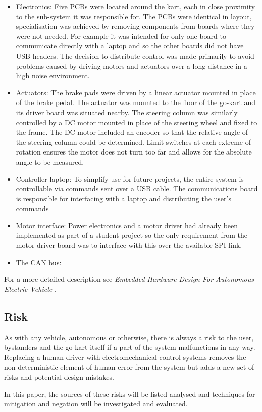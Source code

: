 \begin{itemize}
 \item Electronics: Five PCBs were located around the kart, each in close proximity to 
 the sub-system it was responsible for. The PCBs were identical in layout, specialisation was
 achieved by removing components from boards where they were not needed. For example
 it was intended for only one board to communicate directly with a laptop and so the other
 boards did not have USB headers. The decision to distribute control was made primarily to avoid
 problems caused by driving motors and actuators over a long distance in a high noise environment.
 \item Actuators: The brake pads were driven by a linear actuator mounted in place of the brake pedal. 
 The actuator was mounted to the floor of the go-kart and its driver board was situated nearby. The 
 steering column was similarly controlled by a DC motor mounted in place of the steering wheel 
 and fixed to the frame. The DC motor included an encoder so that the relative angle of the 
 steering column could be determined. Limit switches at each extreme of rotation ensures the
 motor does not turn too far and allows for the absolute angle to be measured.
 \item Controller laptop: To simplify use for future projects, the entire system is controllable via
 commands sent over a USB cable. The communications board is responsible for interfacing with
 a laptop and distributing the user's commands 
 
 \item Motor interface: Power electronics and a motor driver had already been implemented as part 
 of a student project so the only requirement from the motor driver board was to interface with this over
 the available SPI link.

 \item The CAN bus:
\end{itemize}

For a more detailed description see \emph{Embedded Hardware Design For Autonomous Electric
Vehicle} \cite{jenkins_2011}.

\subsection{Risk}
As with any vehicle, autonomous or otherwise, there is always a risk to the user, bystanders and
 the go-kart itself if a part of the system malfunctions in any way. Replacing a human driver with 
 electromechanical control systems removes the non-deterministic element of human error 
 from the system but adds a new set of risks and potential design mistakes.
 
 In this paper, the sources of these risks will be listed analysed and techniques for mitigation and
 negation will be investigated and evaluated.


